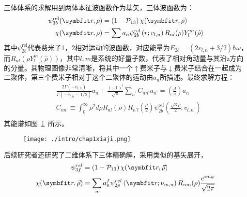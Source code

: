 三体体系的求解用到两体本征波函数作为基矢\cite{Xiaji2009prl}，三体波函数为：
\begin{equation}
\begin{split}
\psi_{3 b}^{\mathrm{rel}}(\Vector{r}, \rho)&=\left(1-\mathcal{P}_{13}\right) \chi(\Vector{r}, \rho)\\
\chi(\Vector{r}, \rho)&=\sum a_{n} \psi_{2 b}^{\mathrm{rel}}\left(r ; v_{l, n}\right) R_{n l}(\rho) Y_{l}^{m}(\hat{\rho})\\
\end{split}
\end{equation}
其中$\psi_{2 b}^{\mathrm{rel}}$代表费米子1，2相对运动的波函数，对应能量为$E_{2b}=(2v_{l,n}+3/2)\hbar\omega$，而$R_{nl}(\rho Y^m_l(\hat{\rho}))$，其中$l,m$是系统的好量子数，代表了相对角动量与其沿z方向的分量。其物理图像非常清晰，将其中一个$\uparrow$费米子与$\downarrow$费米子结合在一起成为二聚体，第三个费米子相对于这个二聚体的运动由$a_n$所描述。最终求解方程：
\begin{equation}
\begin{split}
&\frac{2 \Gamma\left(-v_{l, n}\right)}{\Gamma\left(-v_{l, n}-1 / 2\right)} a_{n}+\frac{(-1)^{l}}{\sqrt{\pi}} \sum_{n^{\prime}} C_{n n^{\prime}} a_{n^{\prime}}=\left(\frac{d}{a}\right) a_{n}\\
&C_{n n^{\prime}} \equiv \int_{0}^{\infty} \rho^{2} d \rho R_{n l}(\rho) R_{n^{\prime} l}\left(\frac{\rho}{2}\right) \psi_{2 b}^{\mathrm{rel}}\left(\frac{\sqrt{3} \rho}{2} ; v_{l, n^{\prime}}\right)\\
\end{split}
\end{equation}
其能谱如图~\ref{xiaji3d}~所示。
\begin{figure}[!htbp]
    \centering
    \texttt{[image: ./intro/chap1xiaji.png]}
    \label{xiaji3d}
\end{figure}
后续研究者\cite{Xiaji20103b}还研究了二维体系下三体精确解，采用类似的基矢展开，
\begin{equation}
\begin{split}
\psi_{3 f}^{r e l}&=\left(1-\mathcal{P}_{13}\right) \chi(\Vector{r}, \vec{\rho})\\
\chi(\Vector{r}, \vec{\rho})&=\sum_{n} a_{n}^{f} \psi_{2 p}^{r e l}\left(\Vector{r} ; \nu_{m, n}\right) R_{n m}(\rho) \frac{e^{i m \varphi}}{\sqrt{2 \pi}}\\
\end{split}
\end{equation}
